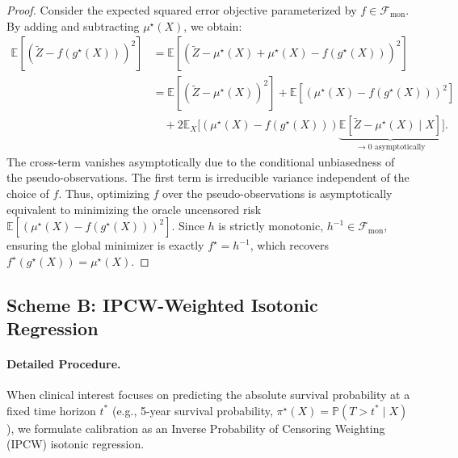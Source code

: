 \documentclass[11pt]{article}
\theoremstyle{plain}
\theoremstyle{plain}
\theoremstyle{plain}
\theoremstyle{plain}
\theoremstyle{plain}
\theoremstyle{plain}
\theoremstyle{plain}
\begin{document}
{\begin{proof}
Consider the expected squared error objective parameterized by $f \in \mathcal{F}_{\text{mon}}$. By adding and subtracting $\mu^\star(X)$, we obtain:
\begin{align*}
    \mathbb{E}\left[ ( \tilde{Z} - f(g^\star(X)) )^2 \right] 
    &= \mathbb{E}\left[ ( \tilde{Z} - \mu^\star(X) + \mu^\star(X) - f(g^\star(X)) )^2 \right] \\
    &= \mathbb{E}\left[ ( \tilde{Z} - \mu^\star(X) )^2 \right] + \mathbb{E}\left[ ( \mu^\star(X) - f(g^\star(X)) )^2 \right] \\
    &\quad + 2\mathbb{E}_X\Big[ ( \mu^\star(X) - f(g^\star(X)) ) \underbrace{\mathbb{E}[ \tilde{Z} - \mu^\star(X) \mid X ]}_{\to 0 \text{ asymptotically}} \Big].
\end{align*}
The cross-term vanishes asymptotically due to the conditional unbiasedness of the pseudo-observations. The first term is irreducible variance independent of the choice of $f$. Thus, optimizing $f$ over the pseudo-observations is asymptotically equivalent to minimizing the oracle uncensored risk $\mathbb{E}[ ( \mu^\star(X) - f(g^\star(X)) )^2 ]$. Since $h$ is strictly monotonic, $h^{-1} \in \mathcal{F}_{\text{mon}}$, ensuring the global minimizer is exactly $f^\star = h^{-1}$, which recovers $f^\star(g^\star(X)) = \mu^\star(X)$.
\end{proof}


\subsection{Scheme B: IPCW-Weighted Isotonic Regression}

\paragraph{Detailed Procedure.}
When clinical interest focuses on predicting the absolute survival probability at a fixed time horizon $t^*$ (e.g., 5-year survival probability, $\pi^\star(X) = \mathbb{P}(T > t^* \mid X)$), we formulate calibration as an Inverse Probability of Censoring Weighting (IPCW) isotonic regression.

}
\end{document}
